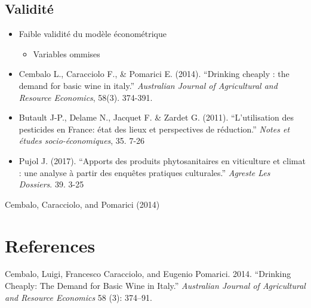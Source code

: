 \documentclass[11pt,]{article}
\providecommand{\tightlist}{%
  \setlength{\itemsep}{0pt}\setlength{\parskip}{0pt}}
\begin{document}
\FloatBarrier

\hypertarget{validite}{%
\subsection{Validité}\label{validite}}

\begin{itemize}
\tightlist
\item
  Faible validité du modèle économétrique

  \begin{itemize}
  \tightlist
  \item
    Variables ommises
  \end{itemize}
\end{itemize}

\FloatBarrier

\begin{itemize}
\tightlist
\item
  Cembalo L., Caracciolo F., \& Pomarici E. (2014). ``Drinking cheaply :
  the demand for basic wine in italy.'' \emph{Australian Journal of
  Agricultural and Resource Economics}, 58(3). 374-391.
\item
  Butault J-P., Delame N., Jacquet F. \& Zardet G. (2011).
  ``L'utilisation des pesticides en France: état des lieux et
  perspectives de réduction.'' \emph{Notes et études socio-économiques},
  35. 7-26
\item
  Pujol J. (2017). ``Apports des produits phytosanitaires en viticulture
  et climat : une analyse à partir des enquêtes pratiques culturales.''
  \emph{Agreste Les Dossiers}. 39. 3-25
\end{itemize}

Cembalo, Caracciolo, and Pomarici (2014)

\hypertarget{references}{%
\section*{References}\label{references}}

\hypertarget{refs}{}
\leavevmode\hypertarget{ref-cembalo2014}{}%
Cembalo, Luigi, Francesco Caracciolo, and Eugenio Pomarici. 2014.
``Drinking Cheaply: The Demand for Basic Wine in Italy.''
\emph{Australian Journal of Agricultural and Resource Economics} 58 (3):
374--91.
\end{document}
